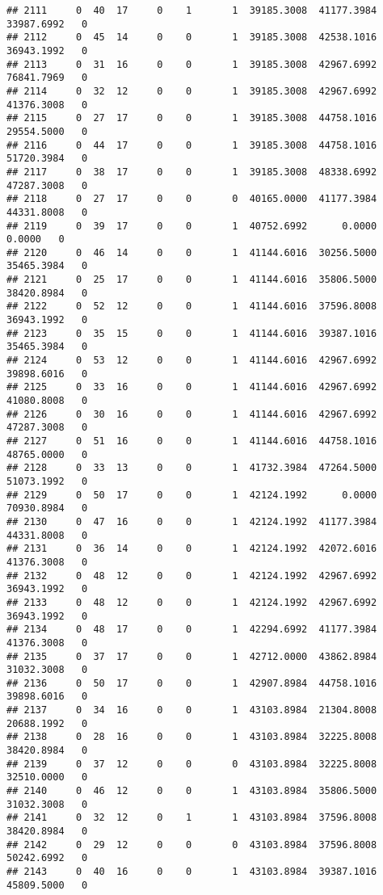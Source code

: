 \documentclass[
]{article}
\begin{document}
\begin{enumerate}
\begin{verbatim}
## 2111     0  40  17     0    1       1  39185.3008  41177.3984  33987.6992   0
## 2112     0  45  14     0    0       1  39185.3008  42538.1016  36943.1992   0
## 2113     0  31  16     0    0       1  39185.3008  42967.6992  76841.7969   0
## 2114     0  32  12     0    0       1  39185.3008  42967.6992  41376.3008   0
## 2115     0  27  17     0    0       1  39185.3008  44758.1016  29554.5000   0
## 2116     0  44  17     0    0       1  39185.3008  44758.1016  51720.3984   0
## 2117     0  38  17     0    0       1  39185.3008  48338.6992  47287.3008   0
## 2118     0  27  17     0    0       0  40165.0000  41177.3984  44331.8008   0
## 2119     0  39  17     0    0       1  40752.6992      0.0000      0.0000   0
## 2120     0  46  14     0    0       1  41144.6016  30256.5000  35465.3984   0
## 2121     0  25  17     0    0       1  41144.6016  35806.5000  38420.8984   0
## 2122     0  52  12     0    0       1  41144.6016  37596.8008  36943.1992   0
## 2123     0  35  15     0    0       1  41144.6016  39387.1016  35465.3984   0
## 2124     0  53  12     0    0       1  41144.6016  42967.6992  39898.6016   0
## 2125     0  33  16     0    0       1  41144.6016  42967.6992  41080.8008   0
## 2126     0  30  16     0    0       1  41144.6016  42967.6992  47287.3008   0
## 2127     0  51  16     0    0       1  41144.6016  44758.1016  48765.0000   0
## 2128     0  33  13     0    0       1  41732.3984  47264.5000  51073.1992   0
## 2129     0  50  17     0    0       1  42124.1992      0.0000  70930.8984   0
## 2130     0  47  16     0    0       1  42124.1992  41177.3984  44331.8008   0
## 2131     0  36  14     0    0       1  42124.1992  42072.6016  41376.3008   0
## 2132     0  48  12     0    0       1  42124.1992  42967.6992  36943.1992   0
## 2133     0  48  12     0    0       1  42124.1992  42967.6992  36943.1992   0
## 2134     0  48  17     0    0       1  42294.6992  41177.3984  41376.3008   0
## 2135     0  37  17     0    0       1  42712.0000  43862.8984  31032.3008   0
## 2136     0  50  17     0    0       1  42907.8984  44758.1016  39898.6016   0
## 2137     0  34  16     0    0       1  43103.8984  21304.8008  20688.1992   0
## 2138     0  28  16     0    0       1  43103.8984  32225.8008  38420.8984   0
## 2139     0  37  12     0    0       0  43103.8984  32225.8008  32510.0000   0
## 2140     0  46  12     0    0       1  43103.8984  35806.5000  31032.3008   0
## 2141     0  32  12     0    1       1  43103.8984  37596.8008  38420.8984   0
## 2142     0  29  12     0    0       0  43103.8984  37596.8008  50242.6992   0
## 2143     0  40  16     0    0       1  43103.8984  39387.1016  45809.5000   0

\end{verbatim}
\end{enumerate}
\end{document}
